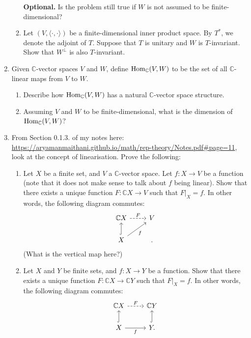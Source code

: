 \documentclass[12pt]{article}
\begin{document}
\begin{enumerate}
\begin{enumerate}
		{\color{red}\textbf{Optional.} Is the problem still true if $W$ is not assumed to be finite-dimensional?}
		\item Let $(V, \langle \cdot, \cdot\rangle)$ be a finite-dimensional inner product space. By $T^{\ast}$, we denote the adjoint of $T$. Suppose that $T$ is unitary and $W$ is $T$-invariant. Show that $W^{\perp}$ is also $T$-invariant.
	\end{enumerate}
	\item Given $\mathbb{C}$-vector spaces $V$ and $W$, define $\operatorname{Hom}_{\mathbb{C}}(V, W)$ to be the set of all $\mathbb{C}$-linear maps from $V$ to $W$.
	\begin{enumerate}
		\item Describe how $\operatorname{Hom}_{\mathbb{C}}(V, W)$ has a natural $\mathbb{C}$-vector space structure.
		\item Assuming $V$ and $W$ to be finite-dimensional, what is the dimension of $\operatorname{Hom}_{\mathbb{C}}(V, W)$?
	\end{enumerate}
	\item From Section 0.1.3. of my notes here: \url{https://aryamanmaithani.github.io/math/rep-theory/Notes.pdf#page=11}, look at the concept of linearisation. Prove the following:
	\begin{enumerate}
		\item Let $X$ be a finite set, and $V$ a $\mathbb{C}$-vector space. Let $f : X \to V$ be a function (note that it does not make sense to talk about $f$ being linear). Show that there exists a unique function $F : \mathbb{C}X \to V$ such that $F|_{X} = f$. In other words, the following diagram commutes:
		\begin{equation*} 
			\begin{tikzcd}
				\mathbb{C}X \arrow[r, "F", dashed] & V \\
				X \arrow[u, hook] \arrow[ru, "f"'] & .
			\end{tikzcd}
		\end{equation*}
		(What is the vertical map here?)
		\item Let $X$ and $Y$ be finite sets, and $f : X \to Y$ be a function. Show that there exists a unique function $F : \mathbb{C}X \to \mathbb{C}Y$ such that $F|_{X} = f$. In other words, the following diagram commutes:
		\begin{equation*} 
			\begin{tikzcd}
				\mathbb{C}X \arrow[r, "F", dashed] & \mathbb{C}Y \\
				X \arrow[u, hook] \arrow[r, "f"'] & Y \arrow[u, hook].

\end{tikzcd}
\end{equation*}
\end{enumerate}
\end{enumerate}
\end{document}
